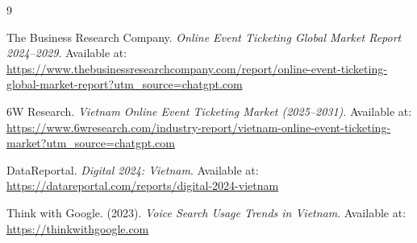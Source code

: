 \begin{thebibliography}{9}

The Business Research Company. \textit{Online Event Ticketing Global Market Report 2024--2029}.  
Available at: \url{https://www.thebusinessresearchcompany.com/report/online-event-ticketing-global-market-report?utm_source=chatgpt.com}

6W Research. \textit{Vietnam Online Event Ticketing Market (2025--2031)}.  
Available at: \url{https://www.6wresearch.com/industry-report/vietnam-online-event-ticketing-market?utm_source=chatgpt.com}

DataReportal. \textit{Digital 2024: Vietnam}.  
Available at: \url{https://datareportal.com/reports/digital-2024-vietnam}

Think with Google. (2023). \textit{Voice Search Usage Trends in Vietnam}.  
Available at: \url{https://thinkwithgoogle.com}

\end{thebibliography}

